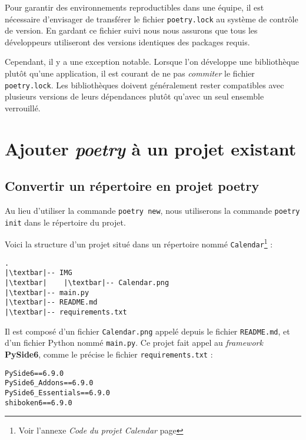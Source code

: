 Pour garantir des environnements reproductibles dans une équipe, il est nécessaire d'envisager de transférer le fichier \texttt{poetry.lock} au système de contrôle de version. En gardant ce fichier suivi nous nous assurons que tous les développeurs utiliseront des versions identiques des packages requis.

Cependant, il y a une exception notable. Lorsque l'on développe une bibliothèque plutôt qu’une application, il est courant de ne pas \textit{commiter} le fichier \texttt{poetry.lock}. Les bibliothèques doivent généralement rester compatibles avec plusieurs versions de leurs dépendances plutôt qu’avec un seul ensemble verrouillé.

\section{Ajouter \textit{poetry} à un projet existant}
\subsection*{Convertir un répertoire en projet \textbf{poetry}}
Au lieu d’utiliser la commande \texttt{poetry new}, nous utiliserons la commande \texttt{poetry init} dans le répertoire du projet.

Voici la structure d'un projet situé dans un répertoire nommé \texttt{Calendar}\footnote{Voir l'annexe \textit{Code du projet Calendar} page \pageref{code_calendar}} :
\begin{lstlisting}[style=tree]
.
|\textbar|-- IMG
|\textbar|    |\textbar|-- Calendar.png
|\textbar|-- main.py
|\textbar|-- README.md
|\textbar|-- requirements.txt
\end{lstlisting}

Il est composé d'un fichier \texttt{Calendar.png} appelé depuis le fichier \texttt{README.md}, et d'un fichier Python nommé \texttt{main.py}. Ce projet fait appel au \textit{framework} \textbf{PySide6}, comme le précise le fichier \texttt{requirements.txt} :
\begin{lstlisting}[style=file]
PySide6==6.9.0
PySide6_Addons==6.9.0
PySide6_Essentials==6.9.0
shiboken6==6.9.0
\end{lstlisting}

